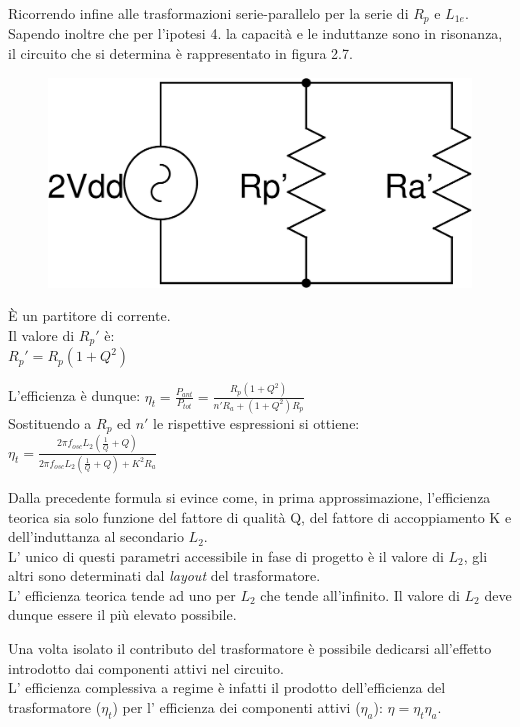 \documentclass[a4paper, 12pt]{memoir}
\begin{document}
Ricorrendo infine alle trasformazioni serie-parallelo\cite[pp. 63-64]{RazaviRF}
per la serie di $R_p $ e $L_{1e}$. Sapendo inoltre che per l'ipotesi 4. 
la capacità e le induttanze sono in risonanza, il circuito che si determina è
rappresentato in figura 2.7. 
\noindent\begin{minipage}{0.35\textwidth}
\begin{figure}[H]
\includegraphics[width=\textwidth]{images/cir_model2.pdf}
\caption{}
\end{figure}
\end{minipage}
\hspace{0.25\textwidth}
\noindent\begin{minipage}{0.4\textwidth}
\`E un partitore di corrente.\\
Il valore di $ R_p' $ è:\\
$ R_p' = R_p \left(1 + Q^2 \right) $
\end{minipage}
L'efficienza è dunque:
{\large$ \eta_t = \frac{P_{ant}}{P_{tot}} = \frac{R_p (1 + Q^2)}{n'R_a + 
(1 + Q^2)R_p} $}
\\Sostituendo a $R_p$ ed $n'$ le rispettive espressioni si ottiene:
{\large$ \eta_t = \frac{2\pi f_{osc} L_2 (\frac{1}{Q} + Q)}{2\pi f_{osc} L_2
(\frac{1}{Q} + Q) + K^2R_a } $ }

Dalla precedente formula si evince come, in prima approssimazione, l'efficienza
teorica sia solo funzione del fattore di qualità Q, del fattore di 
accoppiamento K e dell'induttanza al secondario $L_2$.\\
L' unico di questi parametri accessibile in fase di progetto è il valore di
$L_2$, gli altri sono determinati dal \emph{layout} del trasformatore.\\
L' efficienza teorica tende ad uno per $L_2$ che tende all'infinito. Il valore
di $L_2$ deve dunque essere il più elevato possibile.

Una volta isolato il contributo del trasformatore è possibile dedicarsi 
all'effetto introdotto dai componenti attivi nel circuito.\\
L' efficienza complessiva a regime è infatti il prodotto dell'efficienza del
trasformatore ($\eta_t$) per l' efficienza dei componenti attivi ($\eta_a$):
$ \eta = \eta_t \eta_a $.
\end{document}
